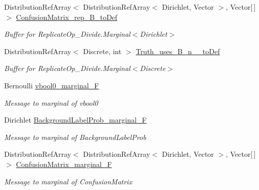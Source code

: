 \begin{DoxyCompactItemize}
\item 
Distribution\+Ref\+Array$<$ Distribution\+Ref\+Array$<$ Dirichlet, Vector $>$, Vector\mbox{[}$\,$\mbox{]}$>$ \hyperlink{class_microsoft_research_1_1_infer_1_1_models_1_1_user_1_1_model___e_p_a3590fbf0f60f036123242d4f0baa5c4f}{Confusion\+Matrix\+\_\+rep\+\_\+\+B\+\_\+to\+Def}
\begin{DoxyCompactList}\small\item\em Buffer for Replicate\+Op\+\_\+\+Divide.\+Marginal$<$\+Dirichlet$>$\end{DoxyCompactList}\item 
Distribution\+Ref\+Array$<$ Discrete, int $>$ \hyperlink{class_microsoft_research_1_1_infer_1_1_models_1_1_user_1_1_model___e_p_ac3fc54a4524ee40acdab6aad09631bc7}{Truth\+\_\+uses\+\_\+\+B\+\_\+n\+\_\+\+\_\+to\+Def}
\begin{DoxyCompactList}\small\item\em Buffer for Replicate\+Op\+\_\+\+Divide.\+Marginal$<$\+Discrete$>$\end{DoxyCompactList}\item 
Bernoulli \hyperlink{class_microsoft_research_1_1_infer_1_1_models_1_1_user_1_1_model___e_p_ac90e3796c29c3bbcb0ad85d8e8ac90c2}{vbool0\+\_\+marginal\+\_\+\+F}
\begin{DoxyCompactList}\small\item\em Message to marginal of \textquotesingle{}vbool0\textquotesingle{}\end{DoxyCompactList}\item 
Dirichlet \hyperlink{class_microsoft_research_1_1_infer_1_1_models_1_1_user_1_1_model___e_p_ad123c1c17c747bf809749496b903795e}{Background\+Label\+Prob\+\_\+marginal\+\_\+\+F}
\begin{DoxyCompactList}\small\item\em Message to marginal of \textquotesingle{}Background\+Label\+Prob\textquotesingle{}\end{DoxyCompactList}\item 
Distribution\+Ref\+Array$<$ Distribution\+Ref\+Array$<$ Dirichlet, Vector $>$, Vector\mbox{[}$\,$\mbox{]}$>$ \hyperlink{class_microsoft_research_1_1_infer_1_1_models_1_1_user_1_1_model___e_p_a826248ad56421c86f0f047e958f5fbce}{Confusion\+Matrix\+\_\+marginal\+\_\+\+F}
\begin{DoxyCompactList}\small\item\em Message to marginal of \textquotesingle{}Confusion\+Matrix\textquotesingle{}\end{DoxyCompactList}\item 

\end{DoxyCompactItemize}
